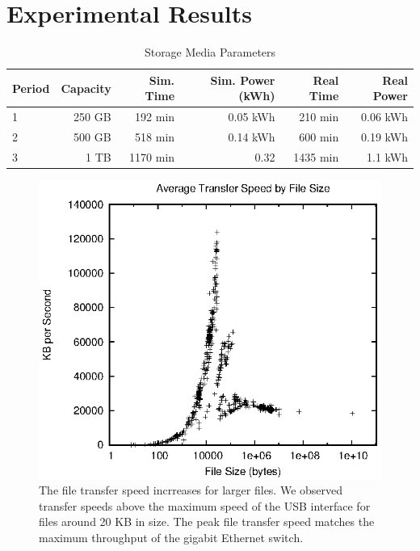 \section{Experimental Results}

\begin{table}[!hbt]
\begin{minipage}{\linewidth}
\centering
  \caption{Storage Media Parameters}
  \label{tab:comp}
  \begin{tabular}{lr|rr|rr}
    \toprule
    \textbf{Period}&\textbf{Capacity}&\textbf{Sim. Time}&\textbf{Sim. Power (kWh)}&\textbf{Real Time}&\textbf{Real Power}\\
    \midrule
    1&250 GB&192 min&0.05 kWh&210 min&0.06 kWh\\
    2&500 GB&518 min&0.14 kWh&600 min&0.19 kWh\\
    3&1 TB&1170 min&0.32&1435 min&1.1 kWh\\
  \bottomrule
\end{tabular}
\end{minipage}
\end{table}


\begin{figure}[!ht]
\includegraphics[width=\linewidth]{fig6.eps}
\caption{The file transfer speed incrreases for larger files.  We observed transfer speeds above the maximum speed of the USB interface for files around 20 KB in size.  The peak file transfer speed matches the maximum throughput of the gigabit Ethernet switch.}
\label{fig6}
\end{figure}

